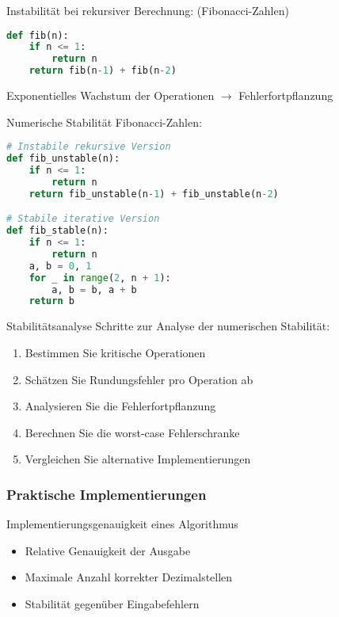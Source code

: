 \begin{examplecode}{Instabilität} bei rekursiver Berechnung: (Fibonacci-Zahlen)
\begin{lstlisting}[language=Python, style=basesmol]
def fib(n):
    if n <= 1:
        return n
    return fib(n-1) + fib(n-2)
\end{lstlisting}
Exponentielles Wachstum der Operationen $\rightarrow$ Fehlerfortpflanzung
\end{examplecode}

\begin{examplecode}{Numerische Stabilität} Fibonacci-Zahlen:
\begin{lstlisting}[language=Python, style=basesmol]
# Instabile rekursive Version
def fib_unstable(n):
    if n <= 1:
        return n
    return fib_unstable(n-1) + fib_unstable(n-2)

# Stabile iterative Version
def fib_stable(n):
    if n <= 1:
        return n
    a, b = 0, 1
    for _ in range(2, n + 1):
        a, b = b, a + b
    return b
\end{lstlisting}
\end{examplecode}

\begin{KR}{Stabilitätsanalyse}
Schritte zur Analyse der numerischen Stabilität:
\begin{enumerate}
    \item Bestimmen Sie kritische Operationen
    \item Schätzen Sie Rundungsfehler pro Operation ab
    \item Analysieren Sie die Fehlerfortpflanzung
    \item Berechnen Sie die worst-case Fehlerschranke
    \item Vergleichen Sie alternative Implementierungen
\end{enumerate}
\end{KR}

\subsubsection{Praktische Implementierungen}

\begin{definition}{Implementierungsgenauigkeit eines Algorithmus}
\begin{itemize}
    \item Relative Genauigkeit der Ausgabe
    \item Maximale Anzahl korrekter Dezimalstellen
    \item Stabilität gegenüber Eingabefehlern
\end{itemize}
\end{definition}

